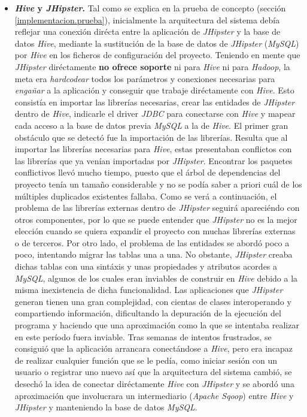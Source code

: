 \begin{itemize}
\item \textbf{\textit{Hive} y \textit{JHipster}.} Tal como se explica en la prueba de concepto (sección \ref{implementacion.prueba}), inicialmente la arquitectura del sistema debía reflejar una conexión dirécta entre la aplicación de \textit{JHipster} y la base de datos \textit{Hive}, mediante la sustitución de la base de datos de \textit{JHipster} (\textit{MySQL}) por \textit{Hive} en los ficheros de configuración del proyecto. Teniendo en mente que \textit{JHipster} diréctamente \textbf{no ofrece soporte} ni para \textit{Hive} ni para \textit{Hadoop}, la meta era \textit{hardcodear} todos los parámetros y conexiones necesarias para \textit{engañar} a la aplicación y conseguir que trabaje diréctamente con \textit{Hive}. Esto consistía en importar las librerías necesarias, crear las entidades de \textit{JHipster} dentro de \textit{Hive}, indicarle el driver \textit{JDBC} para conectarse con \textit{Hive} y mapear cada acceso a la base de datos previa \textit{MySQL} a la de \textit{Hive}. El primer gran obstáculo que se detectó fue la importación de las librerías. Resulta que al importar las librerías necesarias para \textit{Hive}, estas presentaban conflictos con las librerías que ya venían importadas por \textit{JHipster}. Encontrar los paquetes conflictivos llevó mucho tiempo, puesto que el árbol de dependencias del proyecto tenía un tamaño considerable y no se podía saber a priori cuál de los múltiples duplicados existentes fallaba. Como se verá a continuación, el problema de las librerías externas dentro de \textit{JHipster} seguirá apareciéndo con otros componentes, por lo que se puede entender que \textit{JHipster} no es la mejor elección cuando se quiera expandir el proyecto con muchas librerías externas o de terceros. Por otro lado, el problema de las entidades se abordó poco a poco, intentando migrar las tablas una a una. No obstante, \textit{JHipster} creaba dichas tablas con una sintáxis y unas propiedades y atributos acordes a \textit{MySQL}, algunos de los cuales eran inviables de construir en \textit{Hive} debido a la misma inexistencia de dicha funcionalidad. Las aplicaciones que \textit{JHipster} generan tienen una gran complejidad, con cientas de clases interoperando y compartiendo información, dificultando la depuración de la ejecución del programa y haciendo que una aproximación como la que se intentaba realizar en este período fuera inviable. Tras semanas de intentos frustrados, se consiguió que la  aplicación arrancara conectándose a \textit{Hive}, pero era incapaz de realizar cualquier función que se le pedía, como iniciar sesión con un usuario o registrar uno nuevo así que la arquitectura del sistema cambió, se desechó la idea de conectar diréctamente \textit{Hive} con \textit{JHipster} y se abordó una aproximación que involucrara un intermediario (\textit{Apache Sqoop}) entre \textit{Hive} y \textit{JHipster} y manteniendo la base de datos \textit{MySQL}.


\end{itemize}
